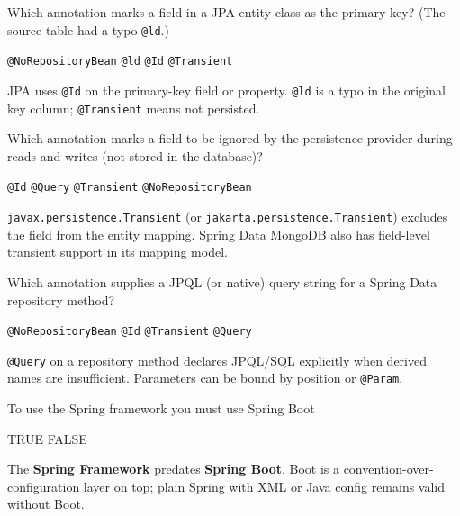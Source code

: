 \question[4]
Which annotation marks a field in a JPA entity class as the primary key? (The source table had a typo \texttt{@ld}.)
\begin{choices}
  \choice \texttt{@NoRepositoryBean}
  \choice \texttt{@ld}
  \CorrectChoice \texttt{@Id}
  \choice \texttt{@Transient}
\end{choices}
\begin{solution}
  JPA uses \texttt{@Id} on the primary-key field or property. \texttt{@ld} is a typo in the original key column; \texttt{@Transient} means not persisted.
\end{solution}

\question[4]
Which annotation marks a field to be ignored by the persistence provider during reads and writes (not stored in the database)?
\begin{choices}
  \choice \texttt{@Id}
  \choice \texttt{@Query}
  \CorrectChoice \texttt{@Transient}
  \choice \texttt{@NoRepositoryBean}
\end{choices}
\begin{solution}
  \texttt{javax.persistence.Transient} (or \texttt{jakarta.persistence.Transient}) excludes the field from the entity mapping. Spring Data MongoDB also has field-level transient support in its mapping model.
\end{solution}

\question[4]
Which annotation supplies a JPQL (or native) query string for a Spring Data repository method?
\begin{choices}
  \choice \texttt{@NoRepositoryBean}
  \choice \texttt{@Id}
  \choice \texttt{@Transient}
  \CorrectChoice \texttt{@Query}
\end{choices}
\begin{solution}
  \texttt{@Query} on a repository method declares JPQL/SQL explicitly when derived names are insufficient. Parameters can be bound by position or \texttt{@Param}.
\end{solution}

\question[4]
To use the Spring framework you must use Spring Boot
\begin{choices}
  \choice TRUE
  \CorrectChoice FALSE
\end{choices}
\begin{solution}
  The \textbf{Spring Framework} predates \textbf{Spring Boot}. Boot is a convention-over-configuration layer on top; plain Spring with XML or Java config remains valid without Boot.
\end{solution}


